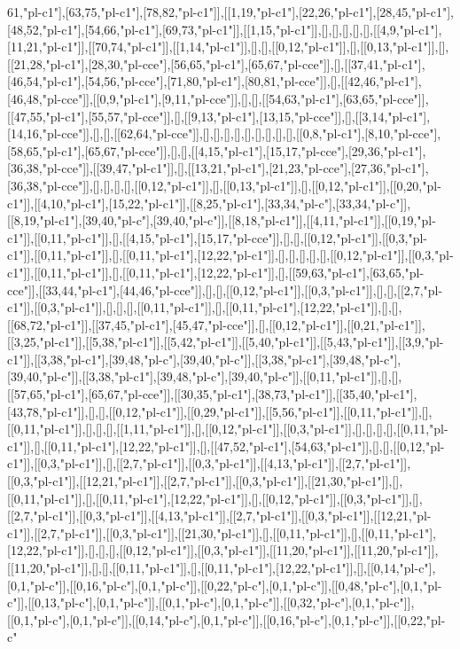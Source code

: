 61,"pl-c1"],[63,75,"pl-c1"],[78,82,"pl-c1"]],[[1,19,"pl-c1"],[22,26,"pl-c1"],[28,45,"pl-c1"],[48,52,"pl-c1"],[54,66,"pl-c1"],[69,73,"pl-c1"]],[[1,15,"pl-c1"]],[],[],[],[],[],[[4,9,"pl-c1"],[11,21,"pl-c1"]],[[70,74,"pl-c1"]],[[1,14,"pl-c1"]],[],[],[[0,12,"pl-c1"]],[],[[0,13,"pl-c1"]],[],[[21,28,"pl-c1"],[28,30,"pl-cce"],[56,65,"pl-c1"],[65,67,"pl-cce"]],[],[[37,41,"pl-c1"],[46,54,"pl-c1"],[54,56,"pl-cce"],[71,80,"pl-c1"],[80,81,"pl-cce"]],[],[[42,46,"pl-c1"],[46,48,"pl-cce"]],[[0,9,"pl-c1"],[9,11,"pl-cce"]],[],[],[[54,63,"pl-c1"],[63,65,"pl-cce"]],[[47,55,"pl-c1"],[55,57,"pl-cce"]],[],[[9,13,"pl-c1"],[13,15,"pl-cce"]],[],[[3,14,"pl-c1"],[14,16,"pl-cce"]],[],[],[[62,64,"pl-cce"]],[],[],[],[],[],[],[],[],[],[[0,8,"pl-c1"],[8,10,"pl-cce"],[58,65,"pl-c1"],[65,67,"pl-cce"]],[],[],[[4,15,"pl-c1"],[15,17,"pl-cce"],[29,36,"pl-c1"],[36,38,"pl-cce"]],[[39,47,"pl-c1"]],[],[[13,21,"pl-c1"],[21,23,"pl-cce"],[27,36,"pl-c1"],[36,38,"pl-cce"]],[],[],[],[],[[0,12,"pl-c1"]],[],[[0,13,"pl-c1"]],[],[[0,12,"pl-c1"]],[[0,20,"pl-c1"]],[[4,10,"pl-c1"],[15,22,"pl-c1"]],[[8,25,"pl-c1"],[33,34,"pl-c"],[33,34,"pl-c"]],[[8,19,"pl-c1"],[39,40,"pl-c"],[39,40,"pl-c"]],[[8,18,"pl-c1"]],[[4,11,"pl-c1"]],[[0,19,"pl-c1"]],[[0,11,"pl-c1"]],[],[[4,15,"pl-c1"],[15,17,"pl-cce"]],[],[],[[0,12,"pl-c1"]],[[0,3,"pl-c1"]],[[0,11,"pl-c1"]],[],[[0,11,"pl-c1"],[12,22,"pl-c1"]],[],[],[],[],[],[[0,12,"pl-c1"]],[[0,3,"pl-c1"]],[[0,11,"pl-c1"]],[],[[0,11,"pl-c1"],[12,22,"pl-c1"]],[],[[59,63,"pl-c1"],[63,65,"pl-cce"]],[[33,44,"pl-c1"],[44,46,"pl-cce"]],[],[],[[0,12,"pl-c1"]],[[0,3,"pl-c1"]],[],[],[[2,7,"pl-c1"]],[[0,3,"pl-c1"]],[],[],[],[[0,11,"pl-c1"]],[],[[0,11,"pl-c1"],[12,22,"pl-c1"]],[],[],[[68,72,"pl-c1"]],[[37,45,"pl-c1"],[45,47,"pl-cce"]],[],[[0,12,"pl-c1"]],[[0,21,"pl-c1"]],[[3,25,"pl-c1"]],[[5,38,"pl-c1"]],[[5,42,"pl-c1"]],[[5,40,"pl-c1"]],[[5,43,"pl-c1"]],[[3,9,"pl-c1"]],[[3,38,"pl-c1"],[39,48,"pl-c"],[39,40,"pl-c"]],[[3,38,"pl-c1"],[39,48,"pl-c"],[39,40,"pl-c"]],[[3,38,"pl-c1"],[39,48,"pl-c"],[39,40,"pl-c"]],[[0,11,"pl-c1"]],[],[],[[57,65,"pl-c1"],[65,67,"pl-cce"]],[[30,35,"pl-c1"],[38,73,"pl-c1"]],[[35,40,"pl-c1"],[43,78,"pl-c1"]],[],[],[[0,12,"pl-c1"]],[[0,29,"pl-c1"]],[[5,56,"pl-c1"]],[[0,11,"pl-c1"]],[],[[0,11,"pl-c1"]],[],[],[],[[1,11,"pl-c1"]],[],[[0,12,"pl-c1"]],[[0,3,"pl-c1"]],[],[],[],[],[[0,11,"pl-c1"]],[],[[0,11,"pl-c1"],[12,22,"pl-c1"]],[],[[47,52,"pl-c1"],[54,63,"pl-c1"]],[],[],[[0,12,"pl-c1"]],[[0,3,"pl-c1"]],[],[[2,7,"pl-c1"]],[[0,3,"pl-c1"]],[[4,13,"pl-c1"]],[[2,7,"pl-c1"]],[[0,3,"pl-c1"]],[[12,21,"pl-c1"]],[[2,7,"pl-c1"]],[[0,3,"pl-c1"]],[[21,30,"pl-c1"]],[],[[0,11,"pl-c1"]],[],[[0,11,"pl-c1"],[12,22,"pl-c1"]],[],[[0,12,"pl-c1"]],[[0,3,"pl-c1"]],[],[[2,7,"pl-c1"]],[[0,3,"pl-c1"]],[[4,13,"pl-c1"]],[[2,7,"pl-c1"]],[[0,3,"pl-c1"]],[[12,21,"pl-c1"]],[[2,7,"pl-c1"]],[[0,3,"pl-c1"]],[[21,30,"pl-c1"]],[],[[0,11,"pl-c1"]],[],[[0,11,"pl-c1"],[12,22,"pl-c1"]],[],[],[],[[0,12,"pl-c1"]],[[0,3,"pl-c1"]],[[11,20,"pl-c1"]],[[11,20,"pl-c1"]],[[11,20,"pl-c1"]],[],[],[[0,11,"pl-c1"]],[],[[0,11,"pl-c1"],[12,22,"pl-c1"]],[],[[0,14,"pl-c"],[0,1,"pl-c"]],[[0,16,"pl-c"],[0,1,"pl-c"]],[[0,22,"pl-c"],[0,1,"pl-c"]],[[0,48,"pl-c"],[0,1,"pl-c"]],[[0,13,"pl-c"],[0,1,"pl-c"]],[[0,1,"pl-c"],[0,1,"pl-c"]],[[0,32,"pl-c"],[0,1,"pl-c"]],[[0,1,"pl-c"],[0,1,"pl-c"]],[[0,14,"pl-c"],[0,1,"pl-c"]],[[0,16,"pl-c"],[0,1,"pl-c"]],[[0,22,"pl-c"